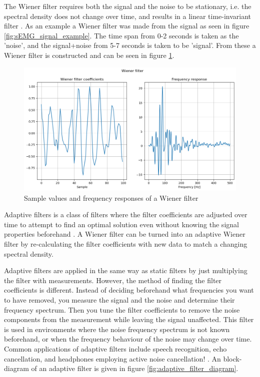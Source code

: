 The Wiener filter requires both the signal and the noise to be stationary, i.e. the spectral density does not change over time, and results in a linear time-invariant filter \cite{stationary_processes_definition} \cite{difference_stationary_nonstationary}. As an example a Wiener filter was made from the signal as seen in figure \ref{fig:sEMG_signal_example}. The time span from 0-2 seconds is taken as the 'noise', and the signal+noise from 5-7 seconds is taken to be 'signal'. From these a Wiener filter is constructed and can be seen in figure \ref{fig:wiener_filter_response}.


\begin{figure}[h!t]
	\begin{center}
		\includegraphics[width=1.0\columnwidth]{images/wiener_filter_response.png}
	\end{center}
	\caption{Sample values and frequency responses of a Wiener filter}
	\label{fig:wiener_filter_response}
\end{figure}

Adaptive filters is a class of filters where the filter coefficients are adjusted over time to attempt to find an optimal solution even without knowing the signal properties beforehand \cite{adaptive_filter_and_applications}. A Wiener filter can be turned into an adaptive Wiener filter by re-calculating the filter coefficients with new data to match a changing spectral density. 

Adaptive filters are applied in the same way as static filters by just multiplying the filter with measurements. However, the method of finding the filter coefficients is different. Instead of deciding beforehand what frequencies you want to have removed, you measure the signal and the noise and determine their frequency spectrum. Then you tune the filter coefficients to remove the noise components from the measurement while leaving the signal unaffected. This filter is used in environments where the noise frequency spectrum is not known beforehand, or when the frequency behaviour of the noise may change over time. Common applications of adaptive filters include speech recognition, echo cancellation, and headphones employing active noise cancellation! \cite{active_noise_cancellation_wiener_filter} \cite{wiener_vs_adaptive_realtime_noisecancellation}. An block-diagram of an adaptive filter is given in figure \ref{fig:adaptive_filter_diagram}.

